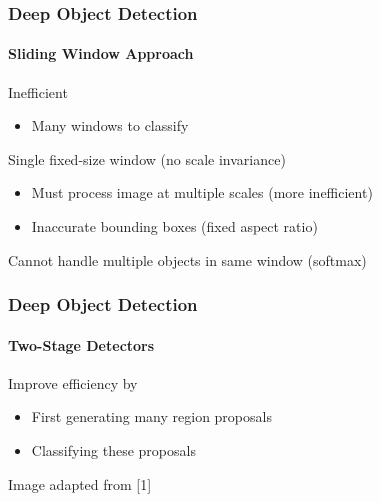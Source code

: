 \documentclass[xetex,professionalfont]{beamer}
\renewcommand\emph[1]{\textcolor{tuwcvl_cvl_blue}{#1}}
\begin{document}
\begin{frame}
	\frametitle{Deep Object Detection}
	\framesubtitle{Sliding Window Approach}

	Inefficient
	\begin{itemize}
		\item Many windows to classify %
	\end{itemize}

	\bigskip

	Single fixed-size window (no scale invariance) %
	\begin{itemize}
		\item Must process image at multiple scales (more inefficient)
		\item Inaccurate bounding boxes (fixed aspect ratio) %
	\end{itemize}

	\bigskip

	Cannot handle multiple objects in same window (softmax) %

\end{frame}


\begin{frame}
	\frametitle{Deep Object Detection}
	\framesubtitle{Two-Stage Detectors}

	Improve efficiency by
	\begin{itemize}
		\item First generating many \emph{region proposals} %
		\item Classifying these proposals
	\end{itemize}

	\medskip

	\begin{center}
		{\centering Image adapted from [1]}
	\end{center}

\end{frame}
\end{document}
